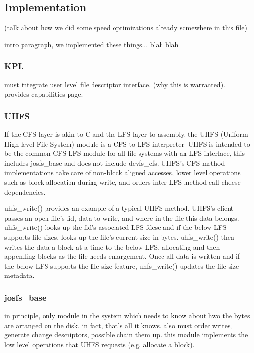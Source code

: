 \subsection{Implementation}
\label{sec:solution:impl}

(talk about how we did some speed optimizations already somewhere in this file)

intro paragraph, we implemented these things... blah blah

\subsubsection{KPL}

must integrate user level file descriptor interface. (why this is
warranted). provides capabilities page.

\subsubsection{UHFS}
\label{sec:solution:impl:uhfs}

If the CFS layer is akin to C and the LFS layer to assembly, the UHFS
(Uniform High level File System) module is a CFS to LFS interpreter. UHFS
is intended to be the common CFS-LFS module for all file systems with an LFS
interface, this includes josfs\_base and does not include devfs\_cfs.
UHFS's CFS method implementations take care of non-block aligned accesses,
lower level operations such as block allocation during write, and 
orders inter-LFS method call chdesc dependencies.

uhfs\_write() provides an example of a typical UHFS method. UHFS's
client passes an open file's fid, data to write, and where in the file
this data belongs. uhfs\_write() looks up the fid's associated LFS
fdesc and if the below LFS supports file sizes, looks up the file's
current size in bytes.  uhfs\_write() then writes the data a block at
a time to the below LFS, allocating and then appending blocks as the
file needs enlargement. Once all data is written and if the below LFS
supports the file size feature, uhfs\_write() updates the file size
metadata.

\subsubsection{josfs\_base}

in principle, only module in the system which needs to know about hwo
the bytes are arranged on the disk. in fact, that's all it knows. also
must order writes, generate change descriptors, possible chain them
up. this module implements the low level operations that UHFS requests
(e.g. allocate a block).

